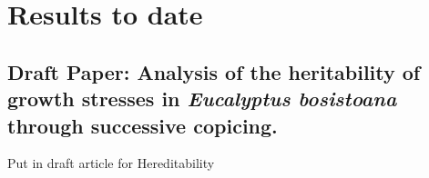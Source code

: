 \section{Results to date}
\subsection{Draft Paper: Analysis of the heritability of growth stresses in \textit{Eucalyptus bosistoana} through successive copicing.}
Put in draft article for Hereditability
  